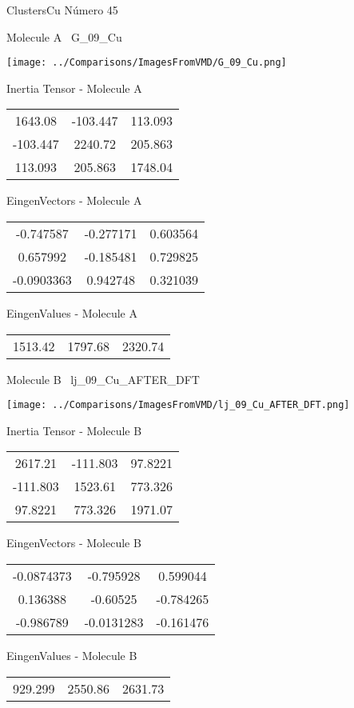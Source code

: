 \vtab[-3cm]
\begin{center}
{\large ClustersCu \tab Número 45}
\end{center}
\begin{multicols}{2}
\begin{center}

Molecule A \
G\_09\_Cu

\texttt{[image: ../Comparisons/ImagesFromVMD/G\_09\_Cu.png]}

Inertia Tensor - Molecule A \\
\begin{tabular}{|c c c|}
1643.08	 & 	-103.447	 & 	113.093	 \\
-103.447	 & 	2240.72	 & 	205.863	 \\
113.093	 & 	205.863	 & 	1748.04
\end{tabular}

\vtab
 EingenVectors - Molecule A     \\
\begin{tabular}{|c c c|}
-0.747587	 & 	-0.277171	 & 	0.603564	 \\
0.657992	 & 	-0.185481	 & 	0.729825	 \\
-0.0903363	 & 	0.942748	 & 	0.321039
\end{tabular}

\vtab
 EingenValues - Molecule A     \\
\begin{tabular}{|c c c|}
1513.42	 & 	1797.68	 & 	2320.74	 \\
\end{tabular}
\columnbreak

Molecule B \
lj\_09\_Cu\_AFTER\_DFT

\texttt{[image: ../Comparisons/ImagesFromVMD/lj\_09\_Cu\_AFTER\_DFT.png]}

Inertia Tensor - Molecule B \\
\begin{tabular}{|c c c|}
2617.21	 & 	-111.803	 & 	97.8221	 \\
-111.803	 & 	1523.61	 & 	773.326	 \\
97.8221	 & 	773.326	 & 	1971.07
\end{tabular}

\vtab
 EingenVectors - Molecule B     \\
\begin{tabular}{|c c c|}
-0.0874373	 & 	-0.795928	 & 	0.599044	 \\
0.136388	 & 	-0.60525	 & 	-0.784265	 \\
-0.986789	 & 	-0.0131283	 & 	-0.161476
\end{tabular}

\vtab
 EingenValues - Molecule B     \\
\begin{tabular}{|c c c|}
929.299	 & 	2550.86	 & 	2631.73	 \\
\end{tabular}

\end{center}
\end{multicols}

